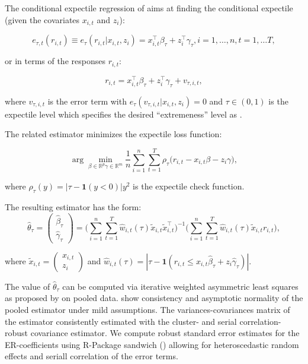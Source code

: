 \documentclass[11pt]{article}
\begin{document}
The conditional expectile regression of \cite{Newey1987} aims at finding the conditional expectile (given the covariates \(x_{i,t}\) and \(z_i\)):

\[e_{\tau,t}(r_{i,t})\equiv e_\tau(r_{i,t}|x_{i,t},z_i) = x_{i,t}^\top \beta_\tau + z_{i}^\top \gamma_\tau, i=1,\ldots, n, t=1,\ldots T,\]

or in terms of the responses \(r_{i,t}\):

\[r_{i,t} = x_{i,t}^\top \beta_\tau + z_{i}^\top \gamma_\tau + v_{\tau,i,t},\]

where \(v_{\tau,i,t}\) is the error term with \(e_\tau(v_{\tau,i,t}|x_{i,t},z_i)=0\) and \(\tau\in (0,1)\) is the expectile level which specifies the desired ``extremeness'' level as \cite{Kneib2013}.

The related estimator minimizes the expectile loss function:

\[\arg\min_{\beta\in\mathbb R^p\gamma\in\mathbb R^m}\frac 1n\sum_{i=1}^n\sum_{t=1}^T\rho_\tau\Big(r_{i,t} - x_{i,t}\beta - z_i\gamma\Big),\]

where \(\rho_\tau(y)=|\tau - \mathbf 1(y<0)|y^2\) is the expectile check function.

The resulting estimator has the form:
\[\hat\theta_\tau =\begin{pmatrix}\hat\beta_\tau\\ \hat\gamma_\tau\end{pmatrix} = \Big(\sum_{i=1}^n\sum_{t=1}^T\hat w_{i,t} (\tau)\tilde x_{i,t}\tilde x_{i,t}^\top\Big)^{-1}\Big(\sum_{i=1}^n\sum_{t=1}^T\hat w_{i,t} (\tau)\tilde x_{i,t}r_{i,t}\Big),\]

where $\tilde x_{i,t} = \begin{pmatrix} x_{i,t}\\z_i\end{pmatrix}$ and \(\hat w_{i,t}(\tau) = |\tau - \mathbf 1(r_{i,t}\leq x_{i,t}\hat\beta_\tau + z_i\hat\gamma_\tau)|\).

The value of $\hat\theta_\tau$ can be computed via iterative weighted asymmetric least squares as proposed by \cite{Newey1987} on pooled data. \cite{BARRY2016} show consistency and asymptotic normality of the pooled estimator under mild assumptions.
%
%
%
%
The variances-covariances matrix of the estimator consistently estimated with the cluster- and serial correlation-robust covariance estimator. We compute robust standard error estimates for the ER-coefficients using R-Package sandwich (\cite{Zeileis2020}) allowing for heteroscedastic random effects and seriall correlation of the error terms.
\end{document}
